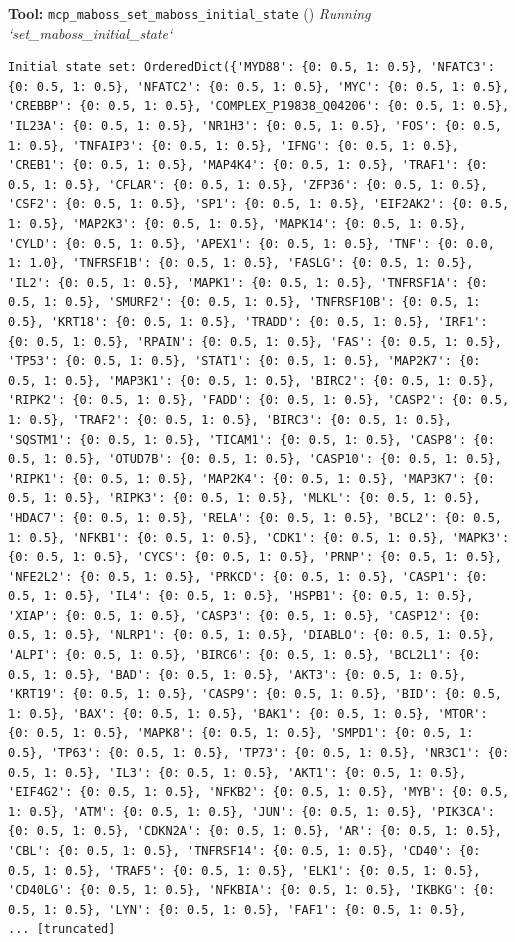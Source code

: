 \documentclass[11pt,a4paper]{article}
\begin{document}
\begin{toolokbox}
\textbf{Tool:} \texttt{mcp\_maboss\_set\_maboss\_initial\_state} (\checkmark)
\textit{Running `set\_maboss\_initial\_state`}
\begin{lstlisting}
Initial state set: OrderedDict({'MYD88': {0: 0.5, 1: 0.5}, 'NFATC3': {0: 0.5, 1: 0.5}, 'NFATC2': {0: 0.5, 1: 0.5}, 'MYC': {0: 0.5, 1: 0.5}, 'CREBBP': {0: 0.5, 1: 0.5}, 'COMPLEX_P19838_Q04206': {0: 0.5, 1: 0.5}, 'IL23A': {0: 0.5, 1: 0.5}, 'NR1H3': {0: 0.5, 1: 0.5}, 'FOS': {0: 0.5, 1: 0.5}, 'TNFAIP3': {0: 0.5, 1: 0.5}, 'IFNG': {0: 0.5, 1: 0.5}, 'CREB1': {0: 0.5, 1: 0.5}, 'MAP4K4': {0: 0.5, 1: 0.5}, 'TRAF1': {0: 0.5, 1: 0.5}, 'CFLAR': {0: 0.5, 1: 0.5}, 'ZFP36': {0: 0.5, 1: 0.5}, 'CSF2': {0: 0.5, 1: 0.5}, 'SP1': {0: 0.5, 1: 0.5}, 'EIF2AK2': {0: 0.5, 1: 0.5}, 'MAP2K3': {0: 0.5, 1: 0.5}, 'MAPK14': {0: 0.5, 1: 0.5}, 'CYLD': {0: 0.5, 1: 0.5}, 'APEX1': {0: 0.5, 1: 0.5}, 'TNF': {0: 0.0, 1: 1.0}, 'TNFRSF1B': {0: 0.5, 1: 0.5}, 'FASLG': {0: 0.5, 1: 0.5}, 'IL2': {0: 0.5, 1: 0.5}, 'MAPK1': {0: 0.5, 1: 0.5}, 'TNFRSF1A': {0: 0.5, 1: 0.5}, 'SMURF2': {0: 0.5, 1: 0.5}, 'TNFRSF10B': {0: 0.5, 1: 0.5}, 'KRT18': {0: 0.5, 1: 0.5}, 'TRADD': {0: 0.5, 1: 0.5}, 'IRF1': {0: 0.5, 1: 0.5}, 'RPAIN': {0: 0.5, 1: 0.5}, 'FAS': {0: 0.5, 1: 0.5}, 'TP53': {0: 0.5, 1: 0.5}, 'STAT1': {0: 0.5, 1: 0.5}, 'MAP2K7': {0: 0.5, 1: 0.5}, 'MAP3K1': {0: 0.5, 1: 0.5}, 'BIRC2': {0: 0.5, 1: 0.5}, 'RIPK2': {0: 0.5, 1: 0.5}, 'FADD': {0: 0.5, 1: 0.5}, 'CASP2': {0: 0.5, 1: 0.5}, 'TRAF2': {0: 0.5, 1: 0.5}, 'BIRC3': {0: 0.5, 1: 0.5}, 'SQSTM1': {0: 0.5, 1: 0.5}, 'TICAM1': {0: 0.5, 1: 0.5}, 'CASP8': {0: 0.5, 1: 0.5}, 'OTUD7B': {0: 0.5, 1: 0.5}, 'CASP10': {0: 0.5, 1: 0.5}, 'RIPK1': {0: 0.5, 1: 0.5}, 'MAP2K4': {0: 0.5, 1: 0.5}, 'MAP3K7': {0: 0.5, 1: 0.5}, 'RIPK3': {0: 0.5, 1: 0.5}, 'MLKL': {0: 0.5, 1: 0.5}, 'HDAC7': {0: 0.5, 1: 0.5}, 'RELA': {0: 0.5, 1: 0.5}, 'BCL2': {0: 0.5, 1: 0.5}, 'NFKB1': {0: 0.5, 1: 0.5}, 'CDK1': {0: 0.5, 1: 0.5}, 'MAPK3': {0: 0.5, 1: 0.5}, 'CYCS': {0: 0.5, 1: 0.5}, 'PRNP': {0: 0.5, 1: 0.5}, 'NFE2L2': {0: 0.5, 1: 0.5}, 'PRKCD': {0: 0.5, 1: 0.5}, 'CASP1': {0: 0.5, 1: 0.5}, 'IL4': {0: 0.5, 1: 0.5}, 'HSPB1': {0: 0.5, 1: 0.5}, 'XIAP': {0: 0.5, 1: 0.5}, 'CASP3': {0: 0.5, 1: 0.5}, 'CASP12': {0: 0.5, 1: 0.5}, 'NLRP1': {0: 0.5, 1: 0.5}, 'DIABLO': {0: 0.5, 1: 0.5}, 'ALPI': {0: 0.5, 1: 0.5}, 'BIRC6': {0: 0.5, 1: 0.5}, 'BCL2L1': {0: 0.5, 1: 0.5}, 'BAD': {0: 0.5, 1: 0.5}, 'AKT3': {0: 0.5, 1: 0.5}, 'KRT19': {0: 0.5, 1: 0.5}, 'CASP9': {0: 0.5, 1: 0.5}, 'BID': {0: 0.5, 1: 0.5}, 'BAX': {0: 0.5, 1: 0.5}, 'BAK1': {0: 0.5, 1: 0.5}, 'MTOR': {0: 0.5, 1: 0.5}, 'MAPK8': {0: 0.5, 1: 0.5}, 'SMPD1': {0: 0.5, 1: 0.5}, 'TP63': {0: 0.5, 1: 0.5}, 'TP73': {0: 0.5, 1: 0.5}, 'NR3C1': {0: 0.5, 1: 0.5}, 'IL3': {0: 0.5, 1: 0.5}, 'AKT1': {0: 0.5, 1: 0.5}, 'EIF4G2': {0: 0.5, 1: 0.5}, 'NFKB2': {0: 0.5, 1: 0.5}, 'MYB': {0: 0.5, 1: 0.5}, 'ATM': {0: 0.5, 1: 0.5}, 'JUN': {0: 0.5, 1: 0.5}, 'PIK3CA': {0: 0.5, 1: 0.5}, 'CDKN2A': {0: 0.5, 1: 0.5}, 'AR': {0: 0.5, 1: 0.5}, 'CBL': {0: 0.5, 1: 0.5}, 'TNFRSF14': {0: 0.5, 1: 0.5}, 'CD40': {0: 0.5, 1: 0.5}, 'TRAF5': {0: 0.5, 1: 0.5}, 'ELK1': {0: 0.5, 1: 0.5}, 'CD40LG': {0: 0.5, 1: 0.5}, 'NFKBIA': {0: 0.5, 1: 0.5}, 'IKBKG': {0: 0.5, 1: 0.5}, 'LYN': {0: 0.5, 1: 0.5}, 'FAF1': {0: 0.5, 1: 0.5},
... [truncated]
\end{lstlisting}
\end{toolokbox}
\end{document}
